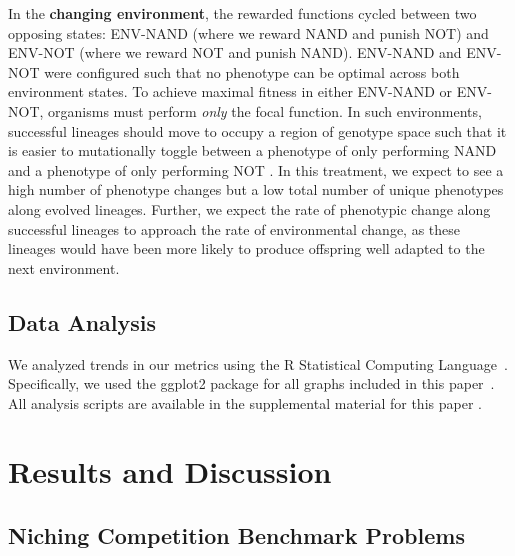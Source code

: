 \documentclass[letterpaper]{article}
\begin{document}
In the \textbf{changing environment}, the rewarded functions cycled between 
two opposing states: ENV-NAND (where we reward NAND and punish NOT) and ENV-NOT (where we reward NOT and punish NAND). 
ENV-NAND and ENV-NOT were configured such that no phenotype can be optimal across both environment states. To achieve maximal fitness in either ENV-NAND or ENV-NOT, organisms must perform \textit{only} the focal function.
In such environments, successful lineages should move to occupy a region of genotype space such that it is easier to mutationally toggle between a phenotype of only performing NAND and a phenotype of only performing NOT \citep{caninokonig_fluctuating_2018}.
In this treatment, we expect to see a high number of phenotype changes but a low total number of unique phenotypes along evolved lineages.
Further, we expect the rate of phenotypic change along successful lineages to approach the rate of environmental change, as these lineages would have been more likely to produce offspring well adapted to the next environment.



\subsection{Data Analysis}

We analyzed trends in our metrics using the R Statistical Computing Language~\citep{r_core_team_r:_2017}. Specifically, we used the ggplot2 package for all graphs included in this paper~\citep{wickham_ggplot2:_2016}. All analysis scripts are available in the supplemental material for this paper \citep{supplement}.


\section{Results and Discussion}

\subsection{Niching Competition Benchmark Problems}
\end{document}
